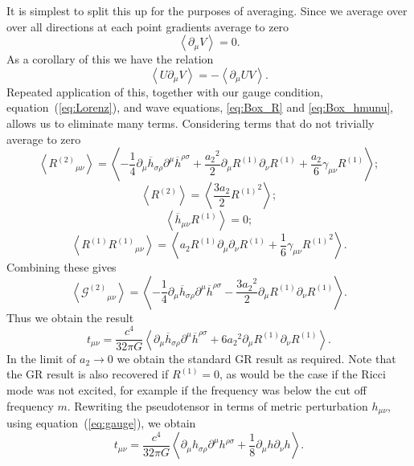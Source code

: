 \documentclass[a4paper, 11pt, titlepage, twoside]{report}
\newcommand{\eqnref}[1]{equation~(\ref{eq:#1})}
\newcommand{\recip}[1]{\ensuremath{\frac{1}{#1}}}
\begin{document}
It is simplest to split this up for the purposes of averaging. Since we average over over all directions at each point gradients average to zero
\begin{equation}
\left\langle\partial_\mu V\right\rangle = 0.
\end{equation}
As a corollary of this we have the relation
\begin{equation}
\left\langle U\partial_\mu V\right\rangle = -\left\langle \partial_\mu U V\right\rangle.
\end{equation}
Repeated application of this, together with our gauge condition, \eqnref{Lorenz}, and wave equations, \eqref{eq:Box_R} and \eqref{eq:Box_hmunu}, allows us to eliminate many terms. Considering terms that do not trivially average to zero
\begin{equation}
\left\langle {R^{(2)}}_{\mu\nu} \right\rangle = \left\langle -\recip{4} \partial_\mu\overline{h}_{\sigma\rho}\partial^\mu\overline{h}^{\rho\sigma} + \frac{{a_2}^2}{2}\partial_\mu R^{(1)}\partial_\nu R^{(1)} + \frac{a_2}{6}\gamma_{\mu\nu}R^{(1)} \right\rangle;
\end{equation}
\begin{equation}
\left\langle R^{(2)} \right\rangle = \left\langle \frac{3a_2}{2}{R^{(1)}}^2 \right\rangle;
\end{equation}
\begin{equation}
\left\langle \overline{h}_{\mu\nu}R^{(1)} \right\rangle = 0;
\end{equation}
\begin{equation}
\left\langle R^{(1)}{R^{(1)}}_{\mu\nu} \right\rangle = \left\langle a_2 R^{(1)} \partial_\mu\partial_\nu R^{(1)} + \recip{6}\gamma_{\mu\nu}{R^{(1)}}^2\right\rangle.
\end{equation}
Combining these gives
\begin{equation}
\left\langle {\mathcal{G}^{(2)}}_{\mu\nu}\right\rangle = \left\langle -\recip{4} \partial_\mu\overline{h}_{\sigma\rho}\partial^\mu\overline{h}^{\rho\sigma} - \frac{3{a_2}^2}{2}\partial_\mu R^{(1)}\partial_\nu R^{(1)} \right\rangle.
\end{equation}
Thus we obtain the result
\begin{equation}
t_{\mu\nu} = \frac{c^4}{32\pi G}\left\langle \partial_\mu\overline{h}_{\sigma\rho}\partial^\mu\overline{h}^{\rho\sigma} + 6{a_2}^2\partial_\mu R^{(1)}\partial_\nu R^{(1)} \right\rangle.
\end{equation}
In the limit of $a_2 \rightarrow 0$ we obtain the standard GR result as required. Note that the GR result is also recovered if $R^{(1)} = 0$, as would be the case if the Ricci mode was not excited, for example if the frequency was below the cut off frequency $m$. Rewriting the pseudotensor in terms of metric perturbation $h_{\mu\nu}$, using \eqnref{gauge}, we obtain
\begin{equation}
t_{\mu\nu} = \frac{c^4}{32\pi G}\left\langle \partial_\mu h_{\sigma\rho}\partial^\mu h^{\rho\sigma} + \recip{8}\partial_\mu h \partial_\nu h \right\rangle.
\end{equation}
\end{document}
